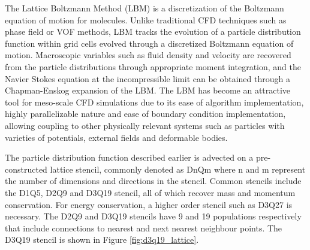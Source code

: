 The Lattice Boltzmann Method (LBM) is a discretization of the Boltzmann equation of motion for molecules. \cite{qian_lattice_1992, succi_lattice_2018, shan_multicomponent_1995, swift_lattice_1996}
Unlike traditional CFD techniques such as phase field or VOF methods, LBM tracks the evolution of a 
particle distribution function within grid cells evolved through a discretized Boltzmann equation of motion. Macroscopic variables such as fluid density and 
velocity are recovered from the particle distributions through appropriate moment integration, and the Navier Stokes equation at the incompressible limit can be 
obtained through a Chapman-Enskog expansion of the LBM. \cite{qian_lattice_1992} The LBM has become an attractive tool for meso-scale CFD simulations due to its ease of algorithm 
implementation, highly parallelizable nature and ease of boundary condition implementation, allowing coupling to other physically relevant systems such as 
particles with varieties of potentials, external fields and deformable bodies.

The particle distribution function described earlier is advected on a pre-constructed lattice stencil, commonly denoted as DnQm where n and m represent the 
number of dimensions and directions in the stencil. \cite{succi_lattice_2018, schmieschek_lb3d_2017}
Common stencils include the D1Q5, D2Q9 and D3Q19 stencil, all of which recover mass and momentum conservation. 
For energy conservation, a higher order stencil such as D3Q27 is necessary. The D2Q9 and D3Q19 stencils have 9 and 19 populations respectively that include 
connections to nearest and next nearest neighbour points. The D3Q19 stencil is shown in Figure \ref{fig:d3q19_lattice}.

